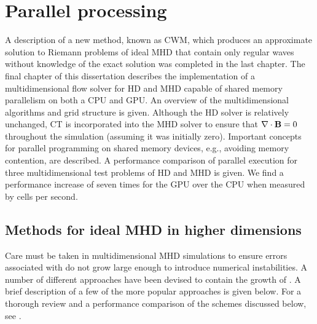 %
%


\chapter[Parallel processing]{Parallel processing}
\label{chp:gpu}

A description of a new method, known as CWM, which produces an approximate solution to Riemann problems of ideal MHD that contain only regular waves without knowledge of the exact solution  was completed in the last chapter.  The final chapter of this dissertation describes the implementation of a multidimensional flow solver for HD and MHD capable of shared memory parallelism on both a CPU and GPU.  An overview of the multidimensional algorithms and grid structure is given.  Although the HD solver is relatively unchanged, CT \citep{Evans:1988} is incorporated into the MHD solver to ensure that $\mathbf{\nabla} \cdot \mathbf{B} = 0$ throughout the simulation (assuming it was initially zero).  Important concepts for parallel programming on shared memory devices, e.g., avoiding memory contention, are described.  A performance comparison of parallel execution for three multidimensional test problems of HD and MHD is given.  We find a performance increase of seven times for the GPU over the CPU when measured by cells per second.  

\section[Methods for ideal MHD in higher dimensions]{Methods for ideal MHD in higher dimensions}          
\label{sec:2d_mhd}

Care must be taken in multidimensional MHD simulations to ensure errors associated with  do not grow large enough to introduce numerical instabilities.  A number of different approaches have been devised to contain the growth of .  A brief description of a few of the more popular approaches is given below.  For a thorough review and a performance comparison of the schemes discussed below, see \citep{Toth:2000}.  

